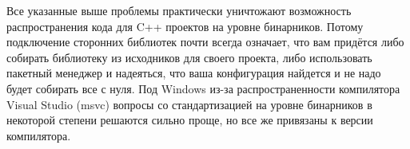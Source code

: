 Все указанные выше проблемы практически уничтожают возможность распространения кода для C++ проектов на уровне бинарников.
Потому подключение сторонних библиотек почти всегда означает, что вам придётся либо собирать библиотеку из исходников для своего проекта, либо использовать пакетный менеджер и надеяться, что ваша конфигурация найдется и не надо будет собирать все с нуля.
Под Windows из-за распространенности компилятора Visual Studio (msvc) вопросы со стандартизацией на уровне бинарников в некоторой степени решаются сильно проще, но все же привязаны к версии компилятора.
